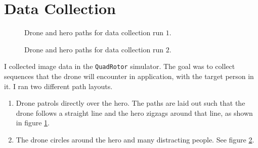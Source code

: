 \documentclass[11pt, onecolumn, oneside, reqno]{article}
\begin{document}
\section{Data Collection}
\label{sec:data_collection}
\begin{figure}
\noindent
{}
\caption[Paths for data collection run $1$]{Drone and hero paths for data collection run $1$.}
\label{img:data_collection_run_1}
\end{figure}

\begin{figure}
\noindent
{}
\caption[Paths for data collection run $2$]{Drone and hero paths for data collection run $2$.}
\label{img:data_collection_run_2}
\end{figure}
I collected image data in the \texttt{QuadRotor} simulator. The goal was to collect sequences that the drone will encounter in application, with the target person in it. I ran two different path layouts.
\begin{enumerate}
\item Drone patrols directly over the hero. The paths are laid out such that the drone follows a straight line and the hero zigzags around that line, as shown in figure \ref{img:data_collection_run_1}.
\item The drone circles around the hero and many distracting people. See figure \ref{img:data_collection_run_2}.
\end{enumerate}
\end{document}
